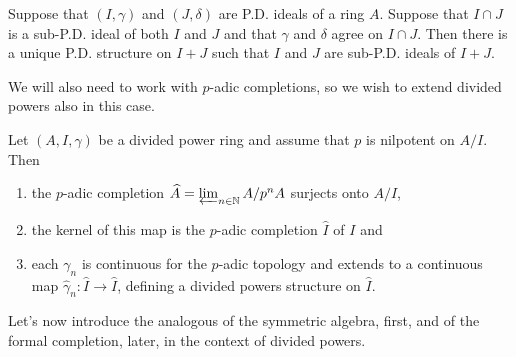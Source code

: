 \begin{prop}\label{lem:PDExt2}
	Suppose that $\left(I, \gamma\right)$ and $\left(J, \delta\right)$ are
	P.D. ideals of a ring $A$.
	Suppose that $I \cap J$ is a sub-P.D. ideal of both
	$I$ and $J$ and that $\gamma$ and $\delta$ agree on
	$I \cap J$.
	Then there is a unique P.D. structure on $I+J$
	such that $I$ and $J$ are sub-P.D. ideals of $I+J$.
\end{prop}


\noindent
We will also need to work with $p$-adic completions, so we wish
to extend divided powers also in this case.
\begin{lem}
	\label{PDExtendCompletion}
	Let $\left(A, I, \gamma\right)$ be a divided power ring and assume
	that $p$ is nilpotent on $A/I$.
	Then
\begin{enumerate}
	\item the $p$-adic completion $\widehat{A} = \varprojlim_{n \in \mathbb{N}}
		A/p^nA$ surjects onto $A/I$,
	\item the kernel of this map is the $p$-adic completion $\widehat{I}$
		of $I$ and
	\item each $\gamma_n$ is continuous for the $p$-adic topology and extends
		to a continuous map $\widehat{\gamma}_n\colon \widehat{I} \to \widehat{I}$,
		defining a divided powers structure on $\widehat{I}$.
\end{enumerate}
\end{lem} 


\noindent
Let's now introduce the analogous of the symmetric algebra, first,
and of the formal completion, later,
in the context of divided powers.


